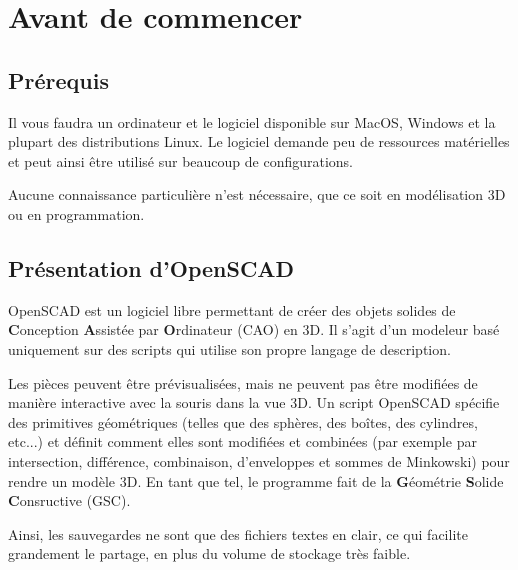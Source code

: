 \section{Avant de commencer}

\subsection{Prérequis}

Il vous faudra un ordinateur et le logiciel  disponible sur MacOS, Windows et la plupart des distributions Linux.
Le logiciel demande peu de ressources matérielles et peut ainsi être utilisé sur beaucoup de configurations.

Aucune connaissance particulière n'est nécessaire, que ce soit en modélisation 3D ou en programmation.


\subsection{Présentation d'OpenSCAD}

OpenSCAD est un logiciel libre permettant de créer des objets solides de \textbf{C}onception \textbf{A}ssistée par \textbf{O}rdinateur (CAO) en 3D.
Il s'agit d'un modeleur basé uniquement sur des scripts qui utilise son propre langage de description.

Les pièces peuvent être prévisualisées, mais ne peuvent pas être modifiées de manière interactive avec la souris dans la vue 3D.
Un script OpenSCAD spécifie des primitives géométriques (telles que des sphères, des boîtes, des cylindres, etc...) et définit comment elles sont modifiées et combinées (par exemple par intersection, différence, combinaison, d'enveloppes et sommes de Minkowski) pour rendre un modèle 3D.
En tant que tel, le programme fait de la \textbf{G}éométrie \textbf{S}olide \textbf{C}onsructive (GSC).

Ainsi, les sauvegardes ne sont que des fichiers textes en clair, ce qui facilite grandement le partage, en plus du volume de stockage très faible.